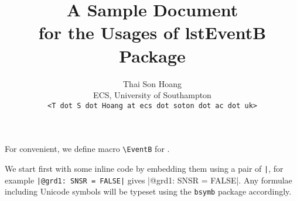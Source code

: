 \usepackage{verbatim}
\usepackage{mdframed}
\title{A Sample Document\\for the Usages of \textsf{lstEventB} Package}
\author{Thai Son Hoang\\ECS, University of Southampton\\\texttt{<T dot S dot Hoang at ecs dot soton dot ac dot uk>}}


\maketitle
For convenient, we define macro \verb|\EventB| for \EventB. 

We start first with some inline \EventB code by embedding them using a pair of \verb$|$, for example \verb$|@grd1: SNSR = FALSE|$ gives |@grd1: SNSR = FALSE|. Any \EventB formulae including Unicode symbols will be typeset using the \verb|bsymb| package accordingly.

